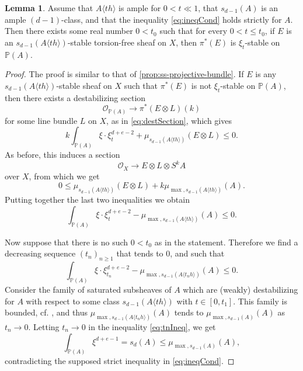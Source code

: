 \documentclass[a4,reqno]{amsart}
\theoremstyle{definition}
\newtheorem{lemma}[theorem]{Lemma}
\def\cO{\mathcal O}
\renewcommand{\P}{\mathbb{P}}
\numberwithin{equation}{section}
\begin{document}
\begin{lemma}\label{lem:stablityAth}
Assume that $A\langle th\rangle$ is ample for $0 < t \ll 1$, that $s_{d-1}(A)$ is an ample $(d-1)$-class, and that the inequality \eqref{eq:ineqCond} holds strictly for $A$. Then there exists some real number $0 < t_0$ such that for every $0 < t \le t_0$, if $E$ is an $s_{d-1}(A\langle th\rangle)$-stable torsion-free sheaf on $X$, then $\pi^*(E)$ is $\xi_t$-stable on $\P(A)$. 
\end{lemma}
\begin{proof}
The proof is similar to that of \cref{prop:ss-projective-bundle}. If $E$ is any $s_{d-1}(A\langle th\rangle)$-stable sheaf on $X$ such that $\pi^*(E)$ is not $\xi_t$-stable on $\P(A)$, then there exists a destabilizing section 
\[
    \cO_{\P(A)}\to \pi^*(E\otimes L)(k)   
\]
for some line bundle $L$ on $X$, as in \eqref{eq:destSection}, which gives
\[
    k \int_{\P(A)}\xi\cdot \xi_t^{d+e-2} + \mu_{s_{d-1}(A\langle th\rangle)}(E \otimes L) \le 0.  
\]
As before, this induces a section
\[
    \cO_X \to E \otimes L \otimes S^kA
\]
over $X$, from which we get
\[
    0 \le \mu_{s_{d-1}(A\langle th\rangle)}(E \otimes L) + k\mu_{\max,s_{d-1}(A\langle th\rangle)}(A).
\]
Putting together the last two inequalities we obtain
\[
    \int_{\P(A)}\xi\cdot \xi_t^{d+e-2} - \mu_{\max,s_{d-1}(A\langle th\rangle)}(A) \le 0.
\]

Now suppose that there is no such $0< t_0$ as in the statement. Therefore we find a decreasing sequence $(t_n)_{n \ge 1}$ that tends to 0, and such that
\begin{equation}\label{eq:tnIneq}
      \int_{\P(A)}\xi\cdot \xi_{t_n}^{d+e-2} - \mu_{\max,s_{d-1}(A\langle t_nh\rangle)}(A) \le 0.
\end{equation}
Consider the family of saturated subsheaves of $A$ which are (weakly) destabilizing for $A$ with respect to some class $s_{d-1}(A\langle th\rangle)$ with $t \in [0,t_1]$. This family is bounded, cf. \cite[Lemma 6.2]{MegyPavelToma}, and thus
$\mu_{\max,s_{d-1}(A\langle t_nh\rangle)}(A)$ tends to $\mu_{\max,s_{d-1}(A)}(A)$ as $t_n \to 0$. Letting $t_n \to 0$ in the inequality \eqref{eq:tnIneq}, we get
\[
    \int_{\P(A)}\xi^{d+e-1} = s_d(A) \le \mu_{\max,s_{d-1}(A)}(A),
\]
contradicting the supposed strict inequality in \eqref{eq:ineqCond}.
\end{proof}
\end{document}
